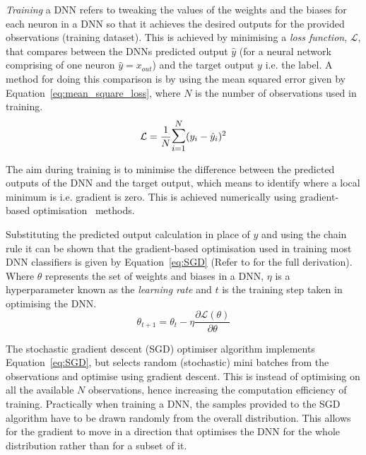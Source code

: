 %


\textit{Training} a DNN refers to tweaking the values of the weights and the biases for each neuron in a DNN so that it achieves the desired outputs for the provided observations (training dataset). 
%
This is achieved by minimising a \textit{loss function}, $\mathcal{L}$, that compares between the DNNs predicted output $\hat{y}$ (for a neural network comprising of one neuron $\hat{y} = x_{out}$) and the target output $y$ i.e. the label. 
%
A method for doing this comparison is by using the mean squared error given by Equation~\ref{eq:mean_square_loss}, where $N$ is the number of observations used in training.
\begin{equation}
    \mathcal{L} = \frac{1}{N} \mathlarger{\mathlarger{\sum}}_{i=1}^{N} (y_i-\hat{y}_i)^2
    \label{eq:mean_square_loss}
\end{equation}

The aim during training is to minimise the difference between the predicted outputs of the DNN and the target output, which means to identify where a local minimum is i.e. gradient is zero. 
%
This is achieved numerically using gradient-based optimisation~\cite{GoodBengCour2016} methods. 

Substituting the predicted output calculation in place of $\hat{y}$ and using the chain rule it can be shown that the gradient-based optimisation used in training most DNN classifiers is given by Equation~\ref{eq:SGD} (Refer to \cite{Parr2018} for the full derivation). 
%
Where $\theta$ represents the set of weights and biases in a DNN, $\eta$ is a hyperparameter known as the \textit{learning rate} and $t$ is the training step taken in optimising the DNN.  
\begin{equation} 
    \theta_{t+1} = \theta_{t} - \eta\dfrac{\partial \mathcal{L}(\theta)}{\partial \theta}
\label{eq:SGD}
\end{equation}

The stochastic gradient descent (SGD) optimiser algorithm implements Equation~\ref{eq:SGD}, but selects random (stochastic) mini batches from the observations and optimise using gradient descent. This is instead of optimising on all the available $N$ observations, hence increasing the computation efficiency of training.
%
Practically when training a DNN, the samples provided to the SGD algorithm have to be drawn randomly from the overall distribution. This allows for the gradient to move in a direction that optimises the DNN for the whole distribution rather than for a subset of it. 

